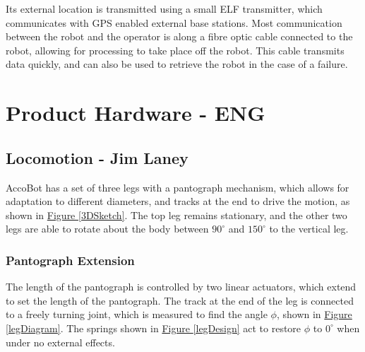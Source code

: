 \documentclass[11pt]{article}		%
\newcommand{\figref}[1]{\hyperref[#1]{Figure \ref*{#1}}}    %
\begin{document}
		\begin{floatingfigure}[r]{0pt} \end{floatingfigure}
		
		Its external location is transmitted using a small ELF transmitter, which communicates with GPS enabled external base stations. 
		Most communication between the robot and the operator is along a fibre optic cable connected to the robot, allowing for processing to take place off the robot.
		This cable transmits data quickly, and can also be used to retrieve the robot in the case of a failure.
	
		\section{Product Hardware - ENG}
	
		\subsection[Locomotion]{Locomotion - Jim Laney} \label{Lomcotion}
		
			AccoBot has a set of three legs with a pantograph mechanism, which allows for adaptation to different diameters, and tracks at the end to drive the motion, as shown in \figref{3DSketch}.
			The top leg remains stationary, and the other two legs are able to rotate about the body between $90^\circ$ and $150^\circ$ to the vertical leg.
			
			\subsubsection{Pantograph Extension}
			
				The length of the pantograph is controlled by two linear actuators, which extend to set the length of the pantograph.
				The track at the end of the leg is connected to a freely turning joint, which is measured to find the angle $\phi$, shown in \figref{legDiagram}.
				The springs shown in \figref{legDesign} act to restore $\phi$ to $0^\circ$ when under no external effects.
				
\end{document}
